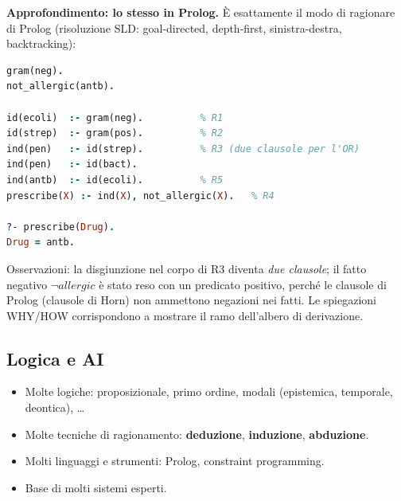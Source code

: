
\begin{note}
  \textbf{Approfondimento: lo stesso in Prolog.} È esattamente il modo di
  ragionare di Prolog (risoluzione SLD: goal-directed, depth-first,
  sinistra-destra, backtracking):
\begin{lstlisting}[language=Prolog]
gram(neg).
not_allergic(antb).

id(ecoli)  :- gram(neg).          % R1
id(strep)  :- gram(pos).          % R2
ind(pen)   :- id(strep).          % R3 (due clausole per l'OR)
ind(pen)   :- id(bact).
ind(antb)  :- id(ecoli).          % R5
prescribe(X) :- ind(X), not_allergic(X).   % R4

?- prescribe(Drug).
Drug = antb.
\end{lstlisting}
  Osservazioni: la disgiunzione nel corpo di R3 diventa \emph{due clausole};
  il fatto negativo $\neg\mathit{allergic}$ è stato reso con un predicato
  positivo, perché le clausole di Prolog (clausole di Horn) non ammettono
  negazioni nei fatti. Le spiegazioni WHY/HOW corrispondono a mostrare il
  ramo dell'albero di derivazione.
\end{note}

\subsection{Logica e AI}
\begin{itemize}
  \item Molte logiche: proposizionale, primo ordine, modali (epistemica,
        temporale, deontica), \dots
  \item Molte tecniche di ragionamento: \textbf{deduzione}, \textbf{induzione},
        \textbf{abduzione}.
  \item Molti linguaggi e strumenti: Prolog, constraint programming.
  \item Base di molti sistemi esperti.
\end{itemize}

